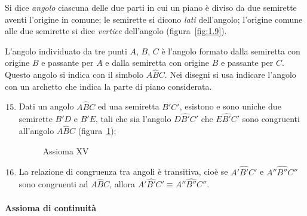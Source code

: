 \begin{definizione}
Si dice \emph{angolo} ciascuna delle due parti in cui un piano è 
diviso da due semirette aventi l'origine in comune; le semirette si 
dicono \emph{lati} dell'angolo; l'origine comune alle due semirette 
si dice \emph{vertice} dell'angolo (figura~\ref{fig:1.9}).
\end{definizione}
\begin{figure*}[bth]
\centering  
\caption{Le semirette $r$ e $s$, aventi l'origine $V$ comune, 
individuano due regioni del piano ognuna delle quali è detta 
\emph{angolo}.}\label{fig:1.9}
\end{figure*}

L'angolo individuato da tre punti $A$, $B$, $C$ è l'angolo formato 
dalla semiretta con origine $B$ e passante per $A$ e dalla semiretta 
con origine $B$ e passante per $C$. Questo angolo si indica con il 
simbolo $A\widehat{B}C$. Nei disegni si usa indicare l'angolo con un 
archetto che indica la parte di piano considerata.

\begin{enumerate}[label=\Roman{*}.]
\setcounter{enumi}{14}
\item Dati un angolo $A\widehat{B}C$ ed una semiretta $B'C'$, 
esistono e sono uniche due semirette $B'D$ e $B'E$, tali che sia 
l'angolo $D\widehat{B'}C'$ che $E\widehat{B'}C'$ sono congruenti 
all'angolo $A\widehat{B}C$ (figura~\ref{fig:1.10});

\begin{inaccessibleblock}
 \begin{figure}[bth]
 \centering 
 \caption{Assioma XV}\label{fig:1.10}
\end{figure}
\end{inaccessibleblock}
\item La relazione di congruenza tra angoli è transitiva, cioè se  
$A'\widehat{B'}C'$ e  $A''\widehat{B''}C''$ sono congruenti ad 
$A\widehat{B}C$, allora  $A'\widehat{B'}C' \equiv 
A''\widehat{B''}C''$.
\end{enumerate}

\paragraph{Assioma di continuità}

